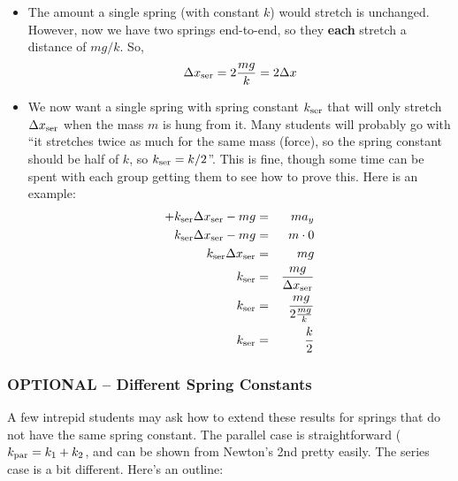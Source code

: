\documentclass[fleqn,letterpaper]{article}
\begin{document}
\begin{itemize}
\item{The amount a single spring (with constant $k$) would stretch is unchanged.  However, now we have two springs end-to-end, so they \textbf{each} stretch a distance of $mg/k$.  So,
\begin{eqnarray}
 \Delta x_{\rm ser} = 2 \frac{mg}{k} = 2 \Delta x
\end{eqnarray}}
\item{We now want a single spring with spring constant $k_{\rm ser}$ that will only stretch $\Delta x_{\rm ser}$ when the mass $m$ is hung from it.  Many students will probably go with ``it stretches twice as much for the same mass (force), so the spring constant should be half of $k$, so $k_{\rm ser} = k/2$''.  This is fine, though some time can be spent with each group getting them to see how to prove this.  Here is an example:
  \begin{eqnarray}
   +k_{\rm ser} \Delta x_{\rm ser} - mg & = & m a_y \\
   k_{\rm ser} \Delta x_{\rm ser} - mg & = & m \cdot 0 \\
   k_{\rm ser} \Delta x_{\rm ser} & = & m g \\
   k_{\rm ser}  & = & \frac{m g}{\Delta x_{\rm ser}} \\
   k_{\rm ser}  & = & \frac{m g}{2 \frac{mg}{k}} \\
   k_{\rm ser}  & = & \frac{k}{2} \\
  \end{eqnarray}
}
\end{itemize}

\subsubsection*{OPTIONAL -- Different Spring Constants}

A few intrepid students may ask how to extend these results for springs that do not have the same spring constant.  The parallel case is straightforward ($k_{\rm par} = k_1 + k_2$, and can be shown from Newton's 2nd pretty easily.  The series case is a bit different.  Here's an outline:
\end{document}

